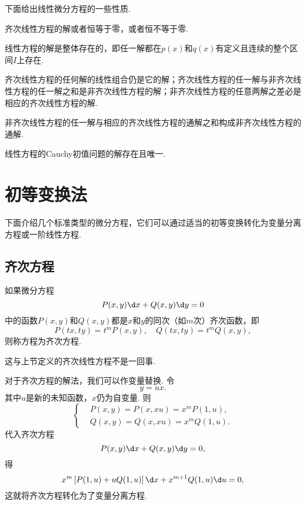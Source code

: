 \documentclass[lang=cn,10pt]{elegantbook}
\begin{document}
下面给出线性微分方程的一些性质.
\begin{theorem}
	齐次线性方程的解或者恒等于零，或者恒不等于零.
\end{theorem}
\begin{theorem}
	线性方程的解是整体存在的，即任一解都在$p(x)$和$q(x)$有定义且连续的整个区间$I$上存在.
\end{theorem}
\begin{theorem}
	齐次线性方程的任何解的线性组合仍是它的解；齐次线性方程的任一解与非齐次线性方程的任一解之和是非齐次线性方程的解；非齐次线性方程的任意两解之差必是相应的齐次线性方程的解.
\end{theorem}
\begin{theorem}
	非齐次线性方程的任一解与相应的齐次线性方程的通解之和构成非齐次线性方程的通解.
\end{theorem}
\begin{theorem}
	线性方程的Cauchy初值问题的解存在且唯一.
\end{theorem}

\section{初等变换法}
下面介绍几个标准类型的微分方程，它们可以通过适当的初等变换转化为变量分离方程或一阶线性方程.
\subsection{齐次方程}
\begin{definition}[齐次方程]
	如果微分方程
	$$P(x,y)\d x+Q(x,y)\d y=0$$
	中的函数$P(x,y)$和$Q(x,y)$都是$x$和$y$的同次（如$m$次）齐次函数，即
	$$P(tx,ty)=t^mP(x,y),\quad Q(tx,ty)=t^mQ(x,y),$$
	则称方程为{\heiti 齐次方程}.
\end{definition}
\begin{remark}
	这与上节定义的齐次线性方程不是一回事.
\end{remark}

对于齐次方程的解法，我们可以作变量替换. 令
$$y=ux.$$
其中$u$是新的未知函数，$x$仍为自变量. 则
\begin{equation*}
	\left\{
	\begin{aligned}
		&P(x,y)=P(x,xu)=x^mP(1,u),\\
		&Q(x,y)=Q(x,xu)=x^mQ(1,u).
	\end{aligned}
	\right.
\end{equation*}
代入齐次方程
$$P(x,y)\d x+Q(x,y)\d y=0,$$
得
$$x^m\left[P(1,u)+uQ(1,u)\right]\d x+x^{m+1}Q(1,u)\d u=0,$$
这就将齐次方程转化为了变量分离方程.
\end{document}
